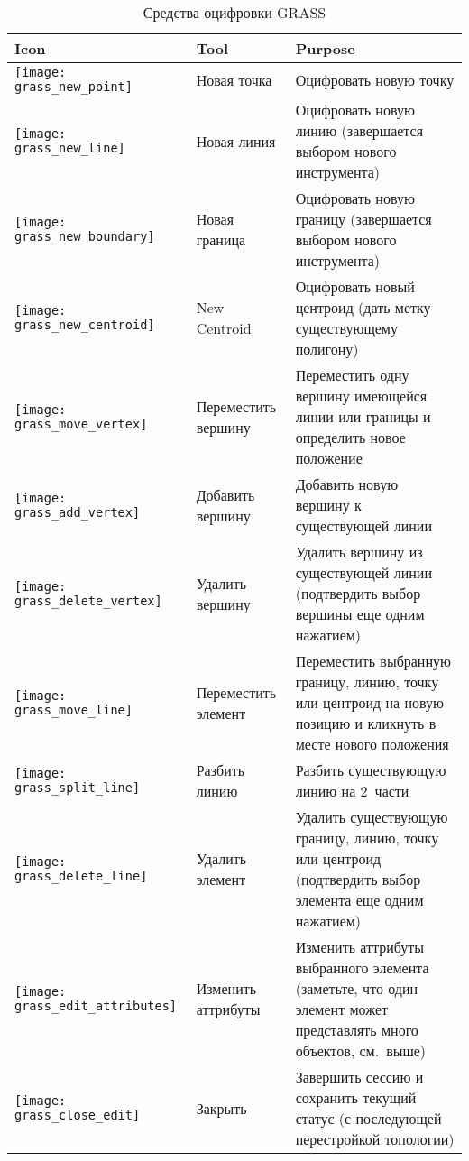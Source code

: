{\renewcommand{\arraystretch}{2}
\begin{table}[h]
\centering
 \begin{tabular}{|m{1cm}|m{4cm}|m{8.5cm}|}
 \hline \textbf{Icon} & \textbf{Tool} & \textbf{Purpose} \\
\hline \texttt{[image: grass\_new\_point]} & Новая точка &
Оцифровать новую точку \\
\hline \texttt{[image: grass\_new\_line]} & Новая линия &
Оцифровать новую линию (завершается выбором нового инструмента) \\
\hline \texttt{[image: grass\_new\_boundary]} & Новая граница &
Оцифровать новую границу (завершается выбором нового инструмента) \\
\hline \texttt{[image: grass\_new\_centroid]} & New Centroid &
Оцифровать новый центроид (дать метку существующему полигону)\\
\hline \texttt{[image: grass\_move\_vertex]} & Переместить
вершину & Переместить одну вершину имеющейся линии или границы и
определить новое положение \\
\hline \texttt{[image: grass\_add\_vertex]} & Добавить
вершину & Добавить новую вершину к существующей линии \\
\hline \texttt{[image: grass\_delete\_vertex]} & Удалить вершину &
Удалить вершину из существующей линии (подтвердить выбор вершины еще
одним нажатием) \\
\hline \texttt{[image: grass\_move\_line]} & Переместить
элемент & Переместить выбранную границу, линию, точку или центроид
на новую позицию и кликнуть в месте нового положения \\
\hline \texttt{[image: grass\_split\_line]} & Разбить линию
& Разбить существующую линию на 2~части \\
\hline \texttt{[image: grass\_delete\_line]} & Удалить элемент &
Удалить существующую границу, линию, точку или центроид (подтвердить выбор элемента еще
одним нажатием) \\
\hline \texttt{[image: grass\_edit\_attributes]} & Изменить аттрибуты
& Изменить аттрибуты выбранного элемента (заметьте, что один элемент
может представлять много объектов, см.~выше) \\
\hline \texttt{[image: grass\_close\_edit]} & Закрыть &
Завершить сессию и сохранить текущий статус (с последующей
перестройкой топологии) \\
\hline
\end{tabular}
\caption{Средства оцифровки GRASS}\label{tab:grass_tools}
\end{table}}

